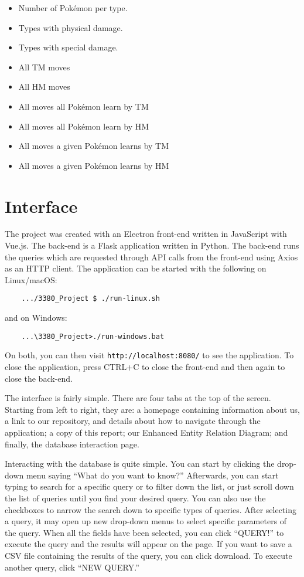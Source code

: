 \documentclass{article}
\begin{document}
\begin{itemize}
    \item Number of Pok\'emon per type.
    \item Types with physical damage.
    \item Types with special damage.
    \item All TM moves
    \item All HM moves
    \item All moves all Pok\'emon learn by TM
    \item All moves all Pok\'emon learn by HM
    \item All moves a given Pok\'emon learns by TM
    \item All moves a given Pok\'emon learns by HM
\end{itemize}

\section{Interface}
The project was created with an Electron front-end written in JavaScript with Vue.js. The back-end
is a Flask application written in Python. The back-end runs the queries which are requested 
through API calls from the front-end using Axios as an HTTP client. 
The application can be started with the following on Linux/macOS:
\begin{verbatim}
    .../3380_Project $ ./run-linux.sh
\end{verbatim}
and on Windows:
\begin{verbatim}
    ...\3380_Project>./run-windows.bat
\end{verbatim}
On both, you can then visit \verb+http://localhost:8080/+ to see the application.
To close the application, press CTRL+C to close the front-end and then again to close the 
back-end.

The interface is fairly simple. There are four tabs at the top of the screen. Starting from left
to right, they are: a homepage containing information about us, a link to our repository, and
details about how to navigate through the application; a copy of this report; our 
Enhanced Entity Relation Diagram; and finally, the database interaction page.

Interacting with the database is quite simple. You can start by clicking the drop-down menu saying
``What do you want to know?'' Afterwards, you can start typing to search for a specific query or 
to filter down the list, or just scroll down the list of queries until you find your desired 
query. You can also use the checkboxes to narrow the search down to specific types of queries. 
After selecting a query, it may open up new drop-down menus to select specific parameters
of the query. When all the fields have been selected, you can click ``QUERY!'' to execute the 
query and the results will appear on the page. 
If you want to save a CSV file containing the results of the query, you can click download. To 
execute another query, click ``NEW QUERY.''
\end{document}

